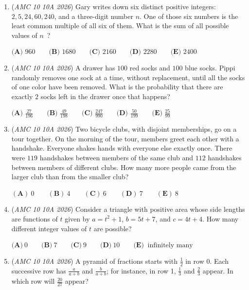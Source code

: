 \begin{enumerate}
 $\textbf{(A) } 19 \qquad\textbf{(B) } 39 \qquad\textbf{(C) } 49 \qquad\textbf{(D) } 89 \qquad\textbf{(E) } 169$


	\item (\textit{AMC 10 10A 2026}) Gary writes down six distinct positive integers: $2, 5, 24, 60, 240$, and a three-digit number $n$.
One of those six numbers is the least common multiple of all six of them. What is the sum
of all possible values of $n$ ?


 $\textbf{(A) } 960 \qquad\textbf{(B) } 1680 \qquad\textbf{(C) } 2160 \qquad\textbf{(D) } 2280 \qquad\textbf{(E) } 2400$


	\item (\textit{AMC 10 10A 2026}) A drawer has $100$ red socks and $100$ blue socks. Pippi randomly removes one sock at a time, without replacement, until all the socks of one color have been removed. What is the probability that there are exactly $2$ socks left in the drawer once that happens?


 $\textbf{(A) } \frac{27}{196} \qquad\textbf{(B) } \frac{49}{198} \qquad\textbf{(C) } \frac{247}{990} \qquad\textbf{(D) } \frac{50}{199} \qquad\textbf{(E) } \frac{25}{99}$


	\item (\textit{AMC 10 10A 2026}) Two bicycle clubs, with disjoint memberships, go on a tour together. On the morning of
the tour, members greet each other with a handshake. Everyone shakes hands with
everyone else exactly once. There were $119$ handshakes between members of the same
club and $112$ handshakes between members of different clubs. How many more people
came from the larger club than from the smaller club?


 $\mathbf{(A)}~0\qquad\mathbf{(B)}~4\qquad\mathbf{(C)}~6\qquad\mathbf{(D)}~7\qquad\mathbf{(E)}~8$


	\item (\textit{AMC 10 10A 2026}) Consider a triangle with positive area whose side lengths are functions of $t$ given by $a = t^2 + 1$, $b = 5t + 7$, and $c = 4t + 4$. How many different integer values of $t$ are possible?


 $\textbf{(A)} ~0 \qquad \textbf{(B)} ~7 \qquad \textbf{(C)} ~9 \qquad \textbf{(D)} ~10 \qquad \textbf{(E)} ~\text{ infinitely many}$


	\item (\textit{AMC 10 10A 2026}) A pyramid of fractions starts with $\frac{1}{2}$ in row 0. Each successive row has $\frac{a}{a+b}$ and $\frac{b}{a+b}$; for instance, in row 1, $\frac{1}{3}$ and $\frac{2}{3}$ appear. In which row will $\frac{20}{27}$ appear?



\end{enumerate}
